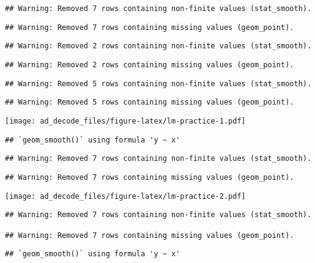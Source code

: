 \documentclass[
]{article}
\begin{document}
\begin{verbatim}
## Warning: Removed 7 rows containing non-finite values (stat_smooth).
\end{verbatim}

\begin{verbatim}
## Warning: Removed 7 rows containing missing values (geom_point).
\end{verbatim}

\begin{verbatim}
## Warning: Removed 2 rows containing non-finite values (stat_smooth).
\end{verbatim}

\begin{verbatim}
## Warning: Removed 2 rows containing missing values (geom_point).
\end{verbatim}

\begin{verbatim}
## Warning: Removed 5 rows containing non-finite values (stat_smooth).
\end{verbatim}

\begin{verbatim}
## Warning: Removed 5 rows containing missing values (geom_point).
\end{verbatim}

\texttt{[image: ad\_decode\_files/figure-latex/lm-practice-1.pdf]}

\begin{verbatim}
## `geom_smooth()` using formula 'y ~ x'
\end{verbatim}

\begin{verbatim}
## Warning: Removed 7 rows containing non-finite values (stat_smooth).
\end{verbatim}

\begin{verbatim}
## Warning: Removed 7 rows containing missing values (geom_point).
\end{verbatim}

\texttt{[image: ad\_decode\_files/figure-latex/lm-practice-2.pdf]}

\begin{verbatim}
## Warning: Removed 7 rows containing non-finite values (stat_smooth).

## Warning: Removed 7 rows containing missing values (geom_point).
\end{verbatim}

\begin{verbatim}
## `geom_smooth()` using formula 'y ~ x'
\end{verbatim}
\end{document}
